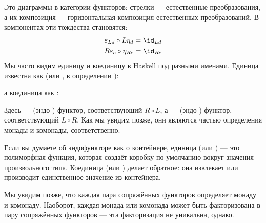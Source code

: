 \begin{figure}[H]
  \centering

  \begin{subfigure}
    \centering
  \end{subfigure}%
  \hspace{1cm}
  \begin{subfigure}
    \centering
  \end{subfigure}
\end{figure}

\noindent
Это диаграммы в категории функторов: стрелки --- естественные
преобразования, а их композиция --- горизонтальная композиция
естественных преобразований. В компонентах эти тождества становятся:
\begin{gather*}
  \varepsilon_{L d} \circ L \eta_d = \id_{L d} \\
  R \varepsilon_{c} \circ \eta_{R c} = \id_{R c}
\end{gather*}
Мы часто видим единицу и коединицу в Haskell под разными именами. Единица
известна как  (или , в определении
):

а коединица как :

Здесь  --- (эндо-) функтор, соответствующий $R \circ L$,
а  --- (эндо-) функтор, соответствующий $L \circ R$. Как
мы увидим позже, они являются частью определения монады и
комонады, соответственно.

Если вы думаете об эндофункторе как о контейнере, единица (или
) --- это полиморфная функция, которая создаёт коробку по умолчанию
вокруг значения произвольного типа. Коединица (или ) делает
обратное: она извлекает или производит единственное значение из контейнера.

Мы увидим позже, что каждая пара сопряжённых функторов определяет монаду и
комонаду. Наоборот, каждая монада или комонада может быть факторизована в
пару сопряжённых функторов --- эта факторизация не уникальна, однако.

